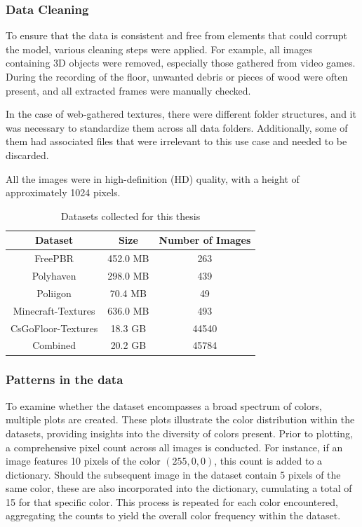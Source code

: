 \subsubsection{Data Cleaning}

    To ensure that the data is consistent and free from elements that could corrupt the model, various cleaning steps were applied. For example, all images containing 3D objects were removed, especially those gathered from video games. During the recording of the floor, unwanted debris or pieces of wood were often present, and all extracted frames were manually checked.

    In the case of web-gathered textures, there were different folder structures, and it was necessary to standardize them across all data folders. Additionally, some of them had associated files that were irrelevant to this use case and needed to be discarded.

    All the images were in high-definition (HD) quality, with a height of approximately 1024 pixels.


    \begin{table}[h]
        \centering
        \begin{tabular}{|c|c|c|}
            \hline
            Dataset & Size & Number of Images \\
            \hline
            FreePBR & 452.0 MB & 263 \\
            Polyhaven & 298.0 MB & 439 \\
            Poliigon & 70.4 MB & 49 \\
            Minecraft-Textures &  636.0 MB & 493 \\
            CsGoFloor-Textures & 18.3 GB & 44540 \\
            \hline
            Combined & 20.2 GB & 45784 \\
            \hline
        \end{tabular}
        \caption{Datasets collected for this thesis}
        \label{tab:datasets}
    \end{table}

    \subsubsection{Patterns in the data}
    
    To examine whether the dataset encompasses a broad spectrum of colors, multiple plots are created. These plots illustrate the color distribution within the datasets, providing insights into the diversity of colors present. Prior to plotting, a comprehensive pixel count across all images is conducted. For instance, if an image features 10 pixels of the color $(255, 0, 0)$, this count is added to a dictionary. Should the subsequent image in the dataset contain 5 pixels of the same color, these are also incorporated into the dictionary, cumulating a total of 15 for that specific color. This process is repeated for each color encountered, aggregating the counts to yield the overall color frequency within the dataset.

